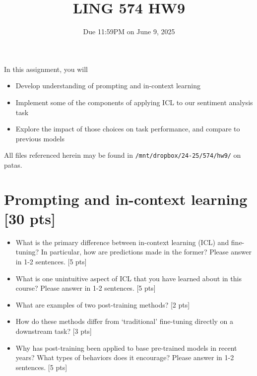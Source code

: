 \documentclass[11pt]{article}
\begin{document}
\title{LING 574 HW9}
\date{\vspace{-0.2in}Due 11:59PM on June 9, 2025}
\maketitle


\noindent In this assignment, you will 
\begin{itemize}
  \item Develop understanding of prompting and in-context learning
  \item Implement some of the components of applying ICL to our sentiment analysis task
  \item Explore the impact of those choices on task performance, and compare to previous models
\end{itemize}
All files referenced herein may be found in \texttt{/mnt/dropbox/24-25/574/hw9/} on patas.


\section{Prompting and in-context learning [30 pts]}

\begin{itemize}
  \item What is the primary difference between in-context learning (ICL) and fine-tuning?  In particular, how are predictions made in the former?  Please answer in 1-2 sentences. \hfill [5 pts]
  \item What is one unintuitive aspect of ICL that you have learned about in this course?  Please answer in 1-2 sentences. \hfill [5 pts]
\end{itemize}

\begin{itemize}
  \item What are examples of two post-training methods? \hfill [2 pts]
  \item How do these methods differ from `traditional' fine-tuning directly on a downstream task? \hfill [3 pts]
  \item Why has post-training been applied to base pre-trained models in recent years?  What types of behaviors does it encourage?  Please answer in 1-2 sentences. \hfill [5 pts]
\end{itemize}
\end{document}
